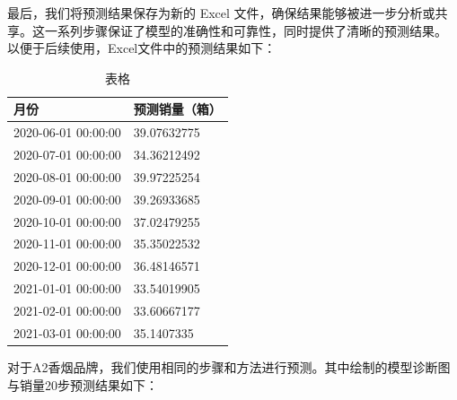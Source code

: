 \documentclass[a4paper]{article}
\begin{document}
	最后，我们将预测结果保存为新的 Excel 文件，确保结果能够被进一步分析或共享。这一系列步骤保证了模型的准确性和可靠性，同时提供了清晰的预测结果。
	以便于后续使用，Excel文件中的预测结果如下：

	\setlength{\extrarowheight}{4pt}
	\begin{table}[H]

		\centering
	
		\begin{tabularx}{\textwidth}{|X|X|} %
	
		\hline
	
		月份 & 预测销量（箱）\\
	
		\hline
	
		2020-06-01 00:00:00	& 39.07632775\\
		\hline
		2020-07-01 00:00:00	& 34.36212492\\
		\hline
		2020-08-01 00:00:00	& 39.97225254\\
		\hline
		2020-09-01 00:00:00	& 39.26933685\\
		\hline
		2020-10-01 00:00:00	& 37.02479255\\
		\hline
		2020-11-01 00:00:00	& 35.35022532\\
		\hline
		2020-12-01 00:00:00	& 36.48146571\\
		\hline
		2021-01-01 00:00:00	& 33.54019905\\
		\hline
		2021-02-01 00:00:00	& 33.60667177\\
		\hline
		2021-03-01 00:00:00	& 35.1407335\\
	
		\hline
	
		\end{tabularx}
	
		\caption{表格}
	
	\end{table}

	对于A2香烟品牌，我们使用相同的步骤和方法进行预测。其中绘制的模型诊断图与销量20步预测结果如下：
\end{document}
